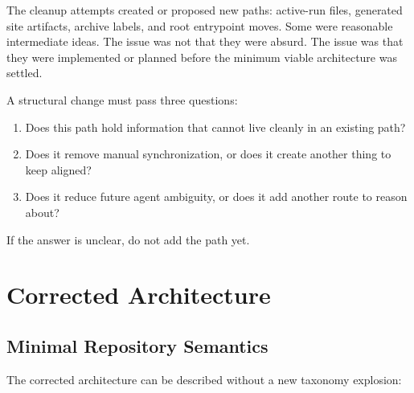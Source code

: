 \documentclass[a4paper,11pt,openany]{report}
\begin{document}
The cleanup attempts created or proposed new paths: active-run files, generated
site artifacts, archive labels, and root entrypoint moves. Some were reasonable
intermediate ideas. The issue was not that they were absurd. The issue was that
they were implemented or planned before the minimum viable architecture was
settled.

A structural change must pass three questions:

\begin{enumerate}
  \item Does this path hold information that cannot live cleanly in an existing
    path?
  \item Does it remove manual synchronization, or does it create another thing to
    keep aligned?
  \item Does it reduce future agent ambiguity, or does it add another route to
    reason about?
\end{enumerate}

If the answer is unclear, do not add the path yet.

\chapter{Corrected Architecture}
\label{ch:corrected-architecture}


\section{Minimal Repository Semantics}

The corrected architecture can be described without a new taxonomy explosion:
\end{document}
